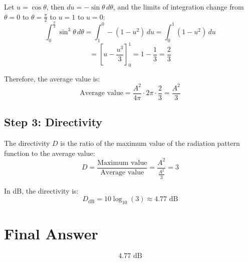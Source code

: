 \documentclass[cn,12pt]{homework}
\begin{document}
\begin{solution}
Let \( u = \cos \theta \), then \( du = -\sin \theta \, d\theta \), and the limits of integration change from \( \theta = 0 \) to \( \theta = \frac{\pi}{2} \) to \( u = 1 \) to \( u = 0 \):
\[ \int_0^{\frac{\pi}{2}} \sin^3 \theta \, d\theta = \int_1^0 - (1 - u^2) \, du = \int_0^1 (1 - u^2) \, du \]
\[ = \left[ u - \frac{u^3}{3} \right]_0^1 = 1 - \frac{1}{3} = \frac{2}{3} \]

Therefore, the average value is:
\[ \text{Average value} = \frac{A^2}{4\pi} \cdot 2\pi \cdot \frac{2}{3} = \frac{A^2}{3} \]

\subsection*{Step 3: Directivity}
The directivity \( D \) is the ratio of the maximum value of the radiation pattern function to the average value:
\[ D = \frac{\text{Maximum value}}{\text{Average value}} = \frac{A^2}{\frac{A^2}{3}} = 3 \]

In dB, the directivity is:
\[ D_{\text{dB}} = 10 \log_{10}(3) \approx 4.77 \text{ dB} \]

\section*{Final Answer}
\[ \boxed{4.77 \text{ dB}} \]
\end{solution}

\newpage
\end{document}
